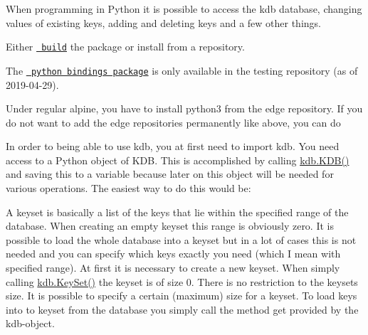 When programming in Python it is possible to access the kdb database, changing values of existing keys, adding and deleting keys and a few other things.

Either \href{https://www.libelektra.org/bindings/swig_python}{\texttt{ build}} the package or install from a repository.

The \href{https://pkgs.alpinelinux.org/packages?name=py3-elektra&branch=edge&repo=testing}{\texttt{ python bindings package}} is only available in the testing repository (as of 2019-\/04-\/29).


\begin{DoxyCode}{0}
\end{DoxyCode}


Under regular alpine, you have to install python3 from the edge repository. If you do not want to add the edge repositories permanently like above, you can do


\begin{DoxyCode}{0}
\end{DoxyCode}


In order to being able to use {\ttfamily kdb}, you at first need to {\ttfamily import kdb}. You need access to a Python object of {\ttfamily K\+DB}. This is accomplished by calling {\ttfamily \mbox{\hyperlink{classkdb_1_1KDB}{kdb.\+K\+D\+B()}}} and saving this to a variable because later on this object will be needed for various operations. The easiest way to do this would be\+:


\begin{DoxyCode}{0}
\DoxyCodeLine{}
\DoxyCodeLine{    \textcolor{comment}{\# do all kinds of operations explained below}}
\end{DoxyCode}


A keyset is basically a list of the keys that lie within the specified range of the database. When creating an empty keyset this range is obviously zero. It is possible to load the whole database into a keyset but in a lot of cases this is not needed and you can specify which keys exactly you need (which I mean with specified range). At first it is necessary to create a new keyset. When simply calling {\ttfamily \mbox{\hyperlink{classkdb_1_1KeySet}{kdb.\+Key\+Set()}}} the keyset is of size 0. There is no restriction to the keyset\textquotesingle{}s size. It is possible to specify a certain (maximum) size for a keyset. To load keys into to keyset from the database you simply call the method {\ttfamily get} provided by the kdb-\/object.


